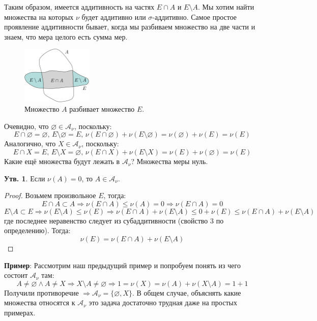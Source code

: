 \documentclass[12pt]{article}
\newcommand{\MA}{\mathcal{A}}
\newcommand{\VN}{\varnothing}
\theoremstyle{definition}
\newtheorem{prop}{Утв.}
\begin{document}
Таким образом, имеется аддитивность на частях $E\cap A$ и $E\setminus A$. Мы хотим найти множества на которых $\nu$ будет аддитивно или $\sigma$-аддитивно. Самое простое проявление аддитивности бывает, когда мы разбиваем множество на две части и знаем, что мера целого есть сумма мер.
\begin{figure}[H]
	\centering
	\includegraphics[width=0.3\textwidth]{MA4L11_1.png}
	\caption{Множество $A$ разбивает множество $E$.}
	\label{11_1}
\end{figure}
Очевидно, что $\VN \in \MA_\nu$, поскольку:
$$
	E \cap \VN = \VN, \, E \setminus \VN = E, \, \nu(E \cap \VN) + \nu(E\setminus \VN) = \nu(\VN) + \nu(E) = \nu(E)
$$
Аналогично, что $X \in \MA_\nu$, поскольку:
$$
	E \cap X = E, \, E \setminus X = \VN, \, \nu(E \cap X) + \nu(E\setminus X) = \nu(E) + \nu(\VN) = \nu(E)
$$
Какие ещё множества будут лежать в $\MA_\nu$? Множества меры нуль.
\begin{prop}
	Если $\nu(A) = 0$, то $A \in \MA_\nu$.
\end{prop}
\begin{proof}
	Возьмем произвольное $E$, тогда: 
	$$
		E \cap A \subset A \Rightarrow \nu(E \cap A) \leq \nu(A) = 0 \Rightarrow  \nu(E \cap A) = 0
	$$
	$$
		E \setminus A \subset E \Rightarrow \nu(E \setminus A) \leq \nu(E) \Rightarrow \nu(E\cap A) + \nu(E\setminus A)  \leq 0 +  \nu(E) \leq \nu(E\cap A) + \nu(E \setminus A) 
	$$
	где последнее неравенство следует из субаддитивности (свойство $3$ по определению). Тогда:
	$$
		\nu(E) = \nu(E\cap A) + \nu(E \setminus A)
	$$
\end{proof}

\textbf{Пример}: Рассмотрим наш предыдущий пример и попробуем понять из чего состоит $\MA_\nu$ там:
$$
	A \neq \VN \wedge A \neq X \Rightarrow X\setminus A \neq \VN \Rightarrow 1 = \nu(X) = \nu(A) + \nu(X \setminus A) = 1 + 1 
$$
Получили противоречие $\Rightarrow \MA_\nu = \{\VN, X\}$. В общем случае, объяснять какие множества относятся к $\MA_\nu$ это задача достаточно трудная даже на простых примерах.
\end{document}
